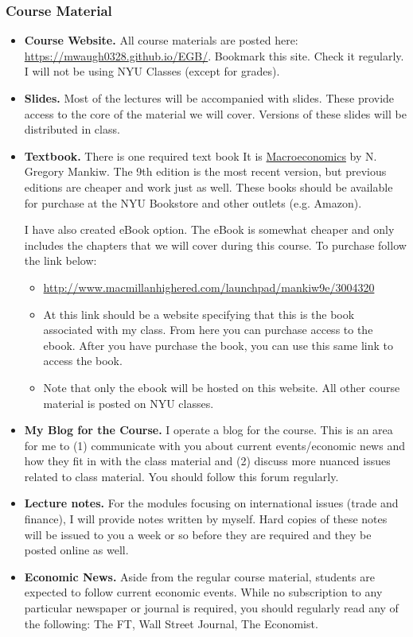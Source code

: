 \documentclass[12pt,pdftex,twoside,letterpaper]{exam}
\begin{document}
\subsubsection*{Course Material}
\begin{itemize}
\item \textbf{Course Website.} All course materials are posted here:
 \url{https://mwaugh0328.github.io/EGB/}. Bookmark this site. Check it regularly. 
 I will not be using NYU Classes (except for grades).


\item \textbf{Slides.}
Most of the lectures will be accompanied with slides. These provide access to the core of the material we will cover. Versions of these slides will be distributed in class.

\item \textbf{Textbook.}
There is one required text book It is \href{https://www.amazon.com/Macroeconomics-N-Gregory-Mankiw/dp/1464182892}{Macroeconomics} by N. Gregory Mankiw. The 9th edition is the most recent version, but previous editions are cheaper and work just as well. These books should be available for purchase at the NYU Bookstore and other outlets (e.g. Amazon).

I have also created eBook option. The eBook is somewhat cheaper and only includes the chapters that we will cover during this course. To purchase follow the link below:
\begin{itemize}
\item \url{http://www.macmillanhighered.com/launchpad/mankiw9e/3004320}
\item At this link should be a website specifying that this is the book associated with my class. From here you can purchase access to the ebook. After you have purchase the book, you can use this same link to access the book.

\item Note that only the ebook will be hosted on this website. All other course material is posted on NYU classes.
\end{itemize}

\item \textbf{My Blog for the Course.} I operate a blog for the course. This is an area for me to (1) communicate with you about current events/economic news and how they fit in with the class material and (2) discuss more nuanced issues related to class material. You should follow this forum regularly.

\item \textbf{Lecture notes.}
For the modules focusing on international issues (trade and finance), I will provide notes written by myself. Hard copies of these notes will be issued to you a week or so before they are required and they be posted online as well.

\item \textbf{Economic News.}
Aside from the regular course material, students are expected to follow current economic events. While no subscription to any particular newspaper or journal is required, you should regularly read any of the following: The FT, Wall Street Journal, The Economist.
\end{itemize}
\end{document}
